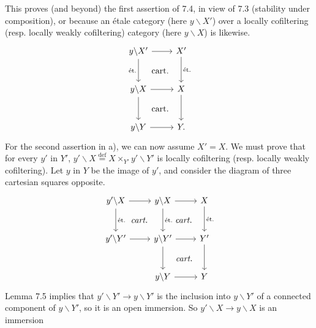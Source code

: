 \documentclass[11pt]{article}
\newcommand{\msp}[1]{\marginpar{\footnotesize [#1]}}
\begin{document}
This proves (and beyond) the first assertion of 7.4, in view of 7.3 (stability under composition), or because an \msp{page 94} étale category (here $y\backslash X'$) over a locally cofiltering (resp. locally weakly cofiltering) category (here $y\backslash X$) is likewise.
\[
\begin{tikzcd}[row sep=large]
y\backslash X' \arrow[r] \arrow[d, "\text{ét.}"'] \arrow[dr, phantom, "\text{cart.}"] & X' \arrow[d, "\text{ét.}"] \\
y\backslash X \arrow[r] \arrow[d] \arrow[dr, phantom, "\text{cart.}"] & X \arrow[d] \\
y\backslash Y \arrow[r] & Y.
\end{tikzcd}
\]
For the second assertion in a), we can now assume $X' = X$. We must prove that for every $y'$ in $Y'$, $y'\backslash X \overset{\text{def}}{=} X \times_{Y'} y'\backslash Y'$ is locally cofiltering (resp. locally weakly cofiltering). Let $y$ in $Y$ be the image of $y'$, and consider the diagram of three cartesian squares opposite.
\[
\begin{tikzcd}[row sep=large]
y'\backslash X \arrow[r] \arrow[d, "\text{ét.}"] \arrow[dr, phantom, "\textit{cart.}"] & y\backslash X \arrow[r] \arrow[d, "\text{ét.}"] \arrow[dr, phantom, "\textit{cart.}"] & X \arrow[d, "\text{ét.}"] \\
y'\backslash Y' \arrow[r] & y\backslash Y' \arrow[r] \arrow[d] \arrow[dr, phantom, "\textit{cart.}"] & Y' \arrow[d] \\
 & y\backslash Y \arrow[r] & Y
\end{tikzcd}
\]
Lemma 7.5 implies that $y'\backslash Y' \longrightarrow y\backslash Y'$ is the inclusion into $y\backslash Y'$ of a connected component of $y\backslash Y'$, so it is an open immersion. So $y'\backslash X \longrightarrow y\backslash X$ is an immersion
\end{document}
